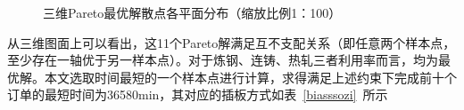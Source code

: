 \documentclass{whutmod}
\begin{document}
  \begin{figure}[H]	
  	\centering
  	\caption{三维Pareto最优解散点各平面分布（缩放比例1：100）}
  	\label{fissssg}
  \end{figure}

从三维图面上可以看出，这11个Pareto解满足互不支配关系（即任意两个样本点，至少存在一轴优于另一样本点）。对于炼钢、连铸、热轧三者利用率而言，均为最优解。本文选取时间最短的一个样本点进行计算，求得满足上述约束下完成前十个订单的最短时间为36580min，其对应的插板方式如表~\ref{biasssozi}~所示
\end{document}
